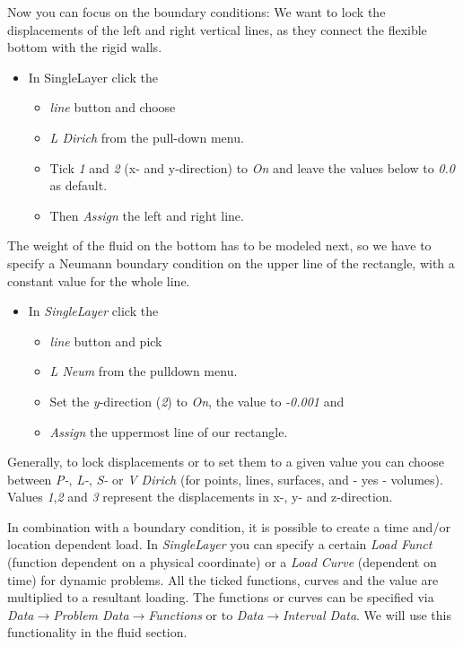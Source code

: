 Now you can focus on the boundary conditions: We want to lock the
displacements of the left and right vertical lines, as they connect
the flexible bottom with the rigid walls. 

\begin{itemize}
\item In SingleLayer click the 

\begin{itemize}
\item \emph{line} button and choose 
\item \emph{L Dirich} from the pull-down menu. 
\item Tick \emph{1} and \emph{2} (x- and y-direction) to \emph{On} and leave
the values below to \emph{0.0} as default.
\item Then \emph{Assign} the left and right line.
\end{itemize}
\end{itemize}
The weight of the fluid on the bottom has to be modeled next, so we
have to specify a Neumann boundary condition on the upper line of
the rectangle, with a constant value for the whole line. 

\begin{itemize}
\item In \emph{SingleLayer} click the 

\begin{itemize}
\item \emph{line} button and pick 
\item \emph{L Neum} from the pulldown menu.
\item Set the \emph{y}-direction (\emph{2}) to \emph{On}, the value to \emph{-0.001} and 
\item \emph{Assign} the uppermost line of our rectangle.
\end{itemize}
\end{itemize}
Generally, to lock displacements or to set them to a given value you
can choose between \emph{P-}, \emph{L-}, \emph{S-} or \emph{V Dirich}
(for points, lines, surfaces, and - yes - volumes). Values \emph{1},\emph{2}
and \emph{3} represent the displacements in x-, y- and z-direction.

In combination with a boundary condition, it is possible to
create a time and/or location dependent load. In \emph{SingleLayer}
you can specify a certain \emph{Load Funct} (function dependent on
a physical coordinate) or a \emph{Load Curve} (dependent on time)
for dynamic problems. All the ticked functions, curves and the value
are multiplied to a resultant loading. The functions or curves can
be specified via \emph{Data$\to$Problem Data$\to$Functions} or to
\emph{Data$\to$Interval Data}. We will use this functionality in the fluid section. 


